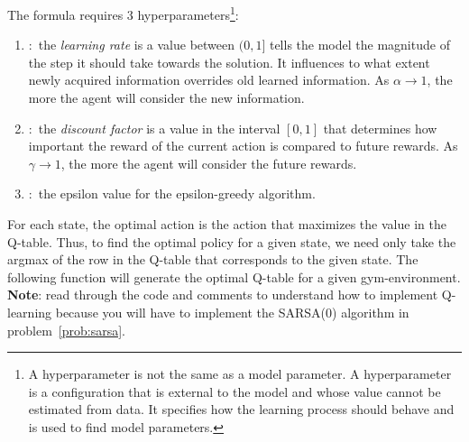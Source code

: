 The formula requires 3 hyperparameters\footnote{A hyperparameter is not the same as a model parameter.
A hyperparameter is a configuration that is external to the model and whose value cannot be estimated from data.
It specifies how the learning process should behave and is used to find model parameters.}:
\begin{enumerate}
\item {}:\ the \emph{learning rate} is a value between $(0,1]$ tells the model the magnitude of the step it should take towards the solution.
It influences to what extent newly acquired information overrides old learned information.
As $\alpha\to1$, the more the agent will consider the new information.

\item {}:\ the \emph{discount factor} is a value in the interval $[0,1]$ that determines how important the reward of the current action is compared to future rewards.
As $\gamma\to1$, the more the agent will consider the future rewards.

\item {}:\ the epsilon value for the epsilon-greedy algorithm.
\end{enumerate}

For each state, the optimal action is the action that maximizes the value in the Q-table.
Thus, to find the optimal policy for a given state, we need only take the argmax of the row in the Q-table that corresponds to the given state.
The following function will generate the optimal Q-table for a given gym-environment.
\textbf{Note}: read through the code and comments to understand how to implement Q-learning because you will have to implement the SARSA(0) algorithm in problem\ \ref{prob:sarsa}.

